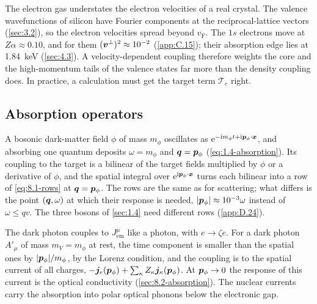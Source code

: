 The electron gas understates the electron velocities of a real crystal. The valence wavefunctions of silicon have Fourier components at the reciprocal-lattice vectors (\cref{sec:3.2}), so the electron velocities spread beyond $v_{\mathrm{F}}$. The $1s$ electrons move at $Z\alpha \approx 0.10$, and for them $(\bm{v}^\perp)^2 \approx 10^{-2}$ (\cref{app:C.15}); their absorption edge lies at \SI{1.84}{keV} (\cref{sec:4.3}). A velocity-dependent coupling therefore weights the core and the high-momentum tails of the valence states far more than the density coupling does. In practice, a calculation must get the target term $\mathcal{T}_e$ right.

\subsection{Absorption operators}\label{sec:8.1-absorption}

A bosonic dark-matter field $\phi$ of mass $m_\phi$ oscillates as $\mathrm{e}^{-\mathrm{i} m_\phi t + \mathrm{i}\bm{p}_\phi\cdot\bm{x}}$, and absorbing one quantum deposits $\omega = m_\phi$ and $\bm{q} = \bm{p}_\phi$ (\cref{eq:1.4-absorption}). Its coupling to the target is a bilinear of the target fields multiplied by $\phi$ or a derivative of $\phi$, and the spatial integral over $\mathrm{e}^{\mathrm{i}\bm{p}_\phi\cdot\bm{x}}$ turns each bilinear into a row of \cref{eq:8.1-rows} at $\bm{q} = \bm{p}_\phi$. The rows are the same as for scattering; what differs is the point $(\bm{q}, \omega)$ at which their response is needed, $|\bm{p}_\phi| \approx 10^{-3}\omega$ instead of $\omega \le qv$. The three bosons of \cref{sec:1.4} need different rows (\cref{app:D.24}).

The dark photon couples to $J^\mu_{\mathrm{em}}$ like a photon, with $e \to \zeta e$. For a dark photon $A'_\mu$ of mass $m_V = m_\phi$ at rest, the time component is smaller than the spatial ones by $|\bm{p}_\phi|/m_\phi$, by the Lorenz condition, and the coupling is to the spatial current of all charges, $-\bm{j}_e(\bm{p}_\phi) + \sum_\kappa Z_\kappa\bm{j}_\kappa(\bm{p}_\phi)$. At $\bm{p}_\phi \to 0$ the response of this current is the optical conductivity (\cref{sec:8.2-absorption}). The nuclear currents carry the absorption into polar optical phonons below the electronic gap.

